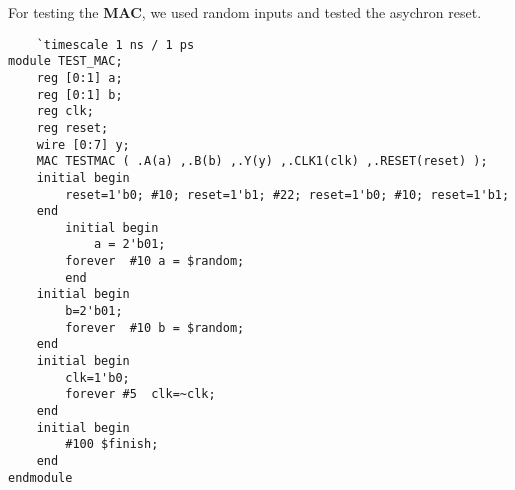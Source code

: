 For testing the \textbf{MAC}, we used random inputs and tested the asychron reset.
\begin{lstlisting}
    `timescale 1 ns / 1 ps
module TEST_MAC;
	reg [0:1] a;
	reg [0:1] b;
	reg clk;
	reg reset;
	wire [0:7] y;
	MAC TESTMAC ( .A(a) ,.B(b) ,.Y(y) ,.CLK1(clk) ,.RESET(reset) );	
	initial begin
		reset=1'b0; #10; reset=1'b1; #22; reset=1'b0; #10; reset=1'b1;	
	end
		initial begin
			a = 2'b01;
  		forever	 #10 a = $random;
        end	  
	initial begin
		b=2'b01;
  		forever	 #10 b = $random;
	end	
	initial begin
		clk=1'b0;
		forever #5	clk=~clk;
	end	
	initial begin
		#100 $finish;
	end	
endmodule	
\end{lstlisting}


